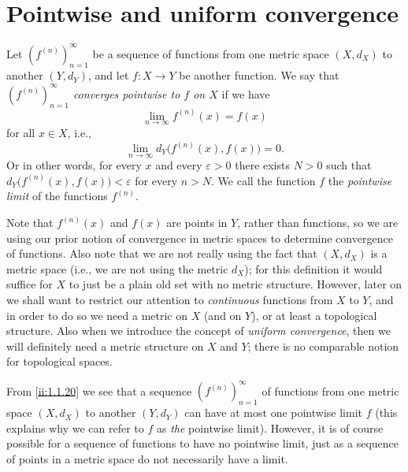 \section{Pointwise and uniform convergence}\label{ii:sec:3.2}

\begin{defn}\label{ii:3.2.1}
  Let \((f^{(n)})_{n = 1}^\infty\) be a sequence of functions from one metric space \((X, d_X)\) to another \((Y, d_Y)\), and let \(f : X \to Y\) be another function.
  We say that \emph{\((f^{(n)})_{n = 1}^\infty\) converges pointwise to \(f\) on \(X\)} if we have
  \[
    \lim_{n \to \infty} f^{(n)}(x) = f(x)
  \]
  for all \(x \in X\), i.e.,
  \[
    \lim_{n \to \infty} d_Y\big(f^{(n)}(x), f(x)\big) = 0.
  \]
  Or in other words, for every \(x\) and every \(\varepsilon > 0\) there exists \(N > 0\) such that \(d_Y\big(f^{(n)}(x), f(x)\big) < \varepsilon\) for every \(n > N\).
  We call the function \(f\) the \emph{pointwise limit} of the functions \(f^{(n)}\).
\end{defn}

\begin{rmk}\label{ii:3.2.2}
  Note that \(f^{(n)}(x)\) and \(f(x)\) are points in \(Y\), rather than functions, so we are using our prior notion of convergence in metric spaces to determine convergence of functions.
  Also note that we are not really using the fact that \((X, d_X)\) is a metric space
  (i.e., we are not using the metric \(d_X\));
  for this definition it would suffice for \(X\) to just be a plain old set with no metric structure.
  However, later on we shall want to restrict our attention to \emph{continuous} functions from \(X\) to \(Y\), and in order to do so we need a metric on \(X\) (and on \(Y\)), or at least a topological structure.
  Also when we introduce the concept of \emph{uniform convergence}, then we will definitely need a metric structure on \(X\) and \(Y\);
  there is no comparable notion for topological spaces.
\end{rmk}

\begin{note}
  From \cref{ii:1.1.20} we see that a sequence \((f^{(n)})_{n = 1}^\infty\) of functions from one metric space \((X, d_X)\) to another \((Y, d_Y)\) can have at most one pointwise limit \(f\)
  (this explains why we can refer to \(f\) as \emph{the} pointwise limit).
  However, it is of course possible for a sequence of functions to have no pointwise limit, just as a sequence of points in a metric space do not necessarily have a limit.
\end{note}

